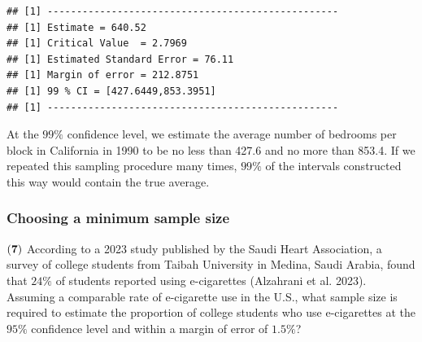 \documentclass[
]{article}
\newenvironment{Shaded}{\begin{snugshade}}{\end{snugshade}}
\newcommand{\AttributeTok}[1]{\textcolor[rgb]{0.13,0.29,0.53}{#1}}
\newcommand{\DecValTok}[1]{\textcolor[rgb]{0.00,0.00,0.81}{#1}}
\newcommand{\FloatTok}[1]{\textcolor[rgb]{0.00,0.00,0.81}{#1}}
\newcommand{\FunctionTok}[1]{\textcolor[rgb]{0.13,0.29,0.53}{\textbf{#1}}}
\newcommand{\NormalTok}[1]{#1}
\newcommand{\OtherTok}[1]{\textcolor[rgb]{0.56,0.35,0.01}{#1}}
\newcommand{\SpecialCharTok}[1]{\textcolor[rgb]{0.81,0.36,0.00}{\textbf{#1}}}
\begin{document}
\begin{Shaded}
\end{Shaded}

\begin{verbatim}
## [1] --------------------------------------------------
## [1] Estimate = 640.52
## [1] Critical Value  = 2.7969
## [1] Estimated Standard Error = 76.11
## [1] Margin of error = 212.8751
## [1] 99 % CI = [427.6449,853.3951]
## [1] --------------------------------------------------
\end{verbatim}

{At the \(99\%\) confidence level, we estimate the average number of
bedrooms per block in California in 1990 to be no less than 427.6 and no
more than 853.4. If we repeated this sampling procedure many times,
\(99\%\) of the intervals constructed this way would contain the true
average.}

\subsubsection{Choosing a minimum sample
size}\label{choosing-a-minimum-sample-size}

\(\bf (7)\) According to a 2023 study published by the Saudi Heart
Association, a survey of college students from Taibah University in
Medina, Saudi Arabia, found that \(24\%\) of students reported using
e-cigarettes (Alzahrani et al. 2023). Assuming a comparable rate of
e-cigarette use in the U.S., what sample size is required to estimate
the proportion of college students who use e-cigarettes at the \(95\%\)
confidence level and within a margin of error of \(1.5\%\)?
\end{document}
